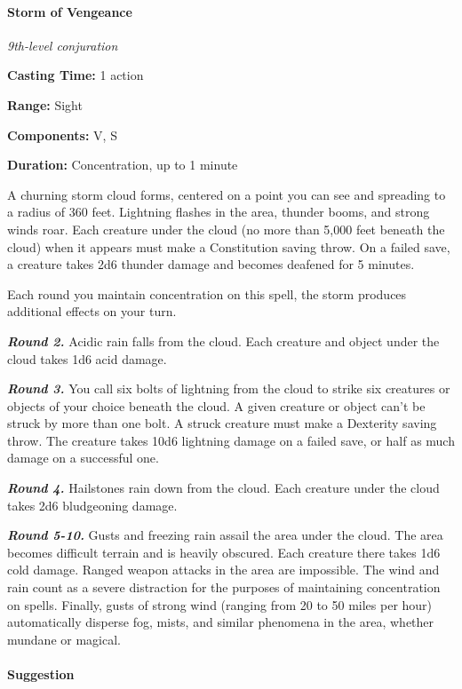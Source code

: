 \documentclass[
]{article}
\begin{document}
\hypertarget{storm-of-vengeance}{%
\paragraph{Storm of Vengeance}\label{storm-of-vengeance}}

\emph{9th-level conjuration}

\textbf{Casting Time:} 1 action

\textbf{Range:} Sight

\textbf{Components:} V, S

\textbf{Duration:} Concentration, up to 1 minute

A churning storm cloud forms, centered on a point you can see and
spreading to a radius of 360 feet. Lightning flashes in the area,
thunder booms, and strong winds roar. Each creature under the cloud (no
more than 5,000 feet beneath the cloud) when it appears must make a
Constitution saving throw. On a failed save, a creature takes 2d6
thunder damage and becomes deafened for 5 minutes.

Each round you maintain concentration on this spell, the storm produces
additional effects on your turn.

\emph{\textbf{Round 2.}} Acidic rain falls from the cloud. Each creature
and object under the cloud takes 1d6 acid damage.

\emph{\textbf{Round 3.}} You call six bolts of lightning from the cloud
to strike six creatures or objects of your choice beneath the cloud. A
given creature or object can't be struck by more than one bolt. A struck
creature must make a Dexterity saving throw. The creature takes 10d6
lightning damage on a failed save, or half as much damage on a
successful one.

\emph{\textbf{Round 4.}} Hailstones rain down from the cloud. Each
creature under the cloud takes 2d6 bludgeoning damage.

\emph{\textbf{Round 5-10.}} Gusts and freezing rain assail the area
under the cloud. The area becomes difficult terrain and is heavily
obscured. Each creature there takes 1d6 cold damage. Ranged weapon
attacks in the area are impossible. The wind and rain count as a severe
distraction for the purposes of maintaining concentration on spells.
Finally, gusts of strong wind (ranging from 20 to 50 miles per hour)
automatically disperse fog, mists, and similar phenomena in the area,
whether mundane or magical.

\hypertarget{suggestion}{%
\paragraph{Suggestion}\label{suggestion}}
\end{document}
